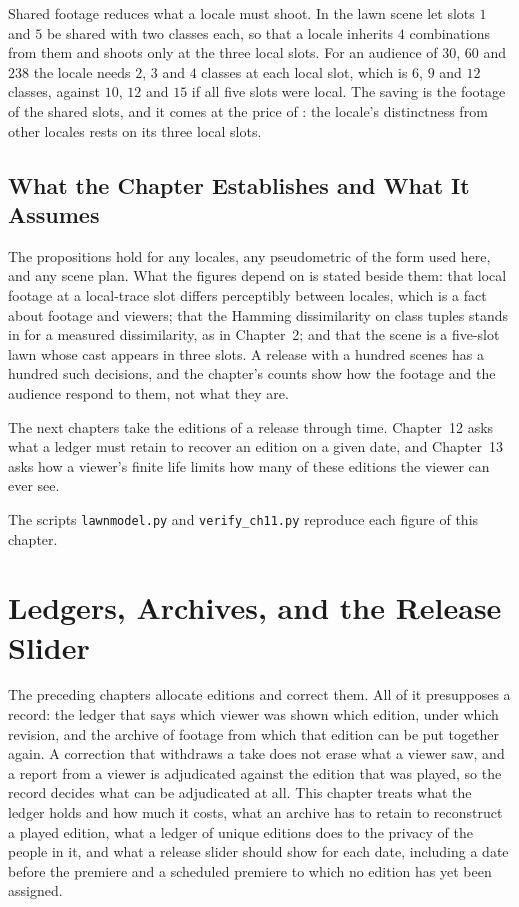 \documentclass[11pt,twoside,openright]{book}
\theoremstyle{plain}
\theoremstyle{definition}
\theoremstyle{remark}
\begin{document}
Shared footage reduces what a locale must shoot. In the lawn scene let slots $1$ and $5$ be shared with two classes each, so that a locale inherits $4$ combinations from them and shoots only at the three local slots. For an audience of $30$, $60$ and $238$ the locale needs $2$, $3$ and $4$ classes at each local slot, which is $6$, $9$ and $12$ classes, against $10$, $12$ and $15$ if all five slots were local. The saving is the footage of the shared slots, and it comes at the price of : the locale's distinctness from other locales rests on its three local slots.

\section{What the Chapter Establishes and What It Assumes}\label{sec:limits11}

The propositions hold for any locales, any pseudometric of the form used here, and any scene plan. What the figures depend on is stated beside them: that local footage at a local-trace slot differs perceptibly between locales, which is a fact about footage and viewers; that the Hamming dissimilarity on class tuples stands in for a measured dissimilarity, as in Chapter~2; and that the scene is a five-slot lawn whose cast appears in three slots. A release with a hundred scenes has a hundred such decisions, and the chapter's counts show how the footage and the audience respond to them, not what they are.

The next chapters take the editions of a release through time. Chapter~12 asks what a ledger must retain to recover an edition on a given date, and Chapter~13 asks how a viewer's finite life limits how many of these editions the viewer can ever see.

The scripts \texttt{lawnmodel.py} and \texttt{verify\_ch11.py} reproduce each figure of this chapter.

\chapter{Ledgers, Archives, and the Release Slider}
\label{ch:ledger}

The preceding chapters allocate editions and correct them. All of it presupposes a record: the ledger that says which viewer was shown which edition, under which revision, and the archive of footage from which that edition can be put together again. A correction that withdraws a take does not erase what a viewer saw, and a report from a viewer is adjudicated against the edition that was played, so the record decides what can be adjudicated at all. This chapter treats what the ledger holds and how much it costs, what an archive has to retain to reconstruct a played edition, what a ledger of unique editions does to the privacy of the people in it, and what a release slider should show for each date, including a date before the premiere and a scheduled premiere to which no edition has yet been assigned.
\end{document}
